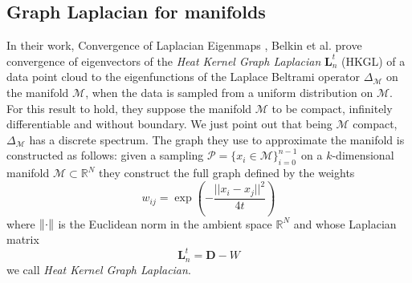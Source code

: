 \subsection{Graph Laplacian for manifolds}\label{sec:Chapter1:theoretical foundations}
In their work, Convergence of Laplacian Eigenmaps \cite{NIPS2006_2989}, Belkin et al. prove convergence of eigenvectors of the \textit{Heat Kernel Graph Laplacian} $\mathbf L_n^t$ (HKGL) of a data point cloud to the eigenfunctions of the Laplace Beltrami operator $\Delta_\mathcal M$ on the manifold $\mathcal M$, when the data is sampled from a uniform distribution on $\mathcal M$.
For this result to hold, they suppose the manifold $\mathcal M$ to be compact, infinitely differentiable and without boundary. We just point out that being $\mathcal M$ compact, $\Delta_\mathcal M$ has a discrete spectrum. The graph they use to approximate the manifold is constructed as follows: given a sampling $ \mathcal P = \{x_i\in\mathcal M\}_{i=0}^{n-1}$ on a $k$-dimensional manifold $\mathcal M\subset \mathbb R^N$ they construct the full graph defined by the weights 
$$
w_{ij}=\exp\left({-\frac{||x_i-x_j||^2}{4t}}\right)
$$
where $\left\lVert\cdot\right\rVert$ is the Euclidean norm in the ambient space $\mathbb R^N$ and whose Laplacian matrix 
$$
\mathbf L_n^t = \mathbf D-W
$$ we call \textit{Heat Kernel Graph Laplacian}.

